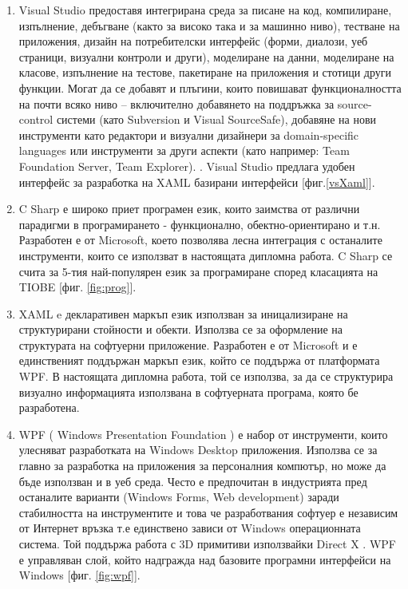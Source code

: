 \begin{enumerate}
    \item Visual Studio предоставя интегрирана среда за писане на код, компилиране, изпълнение, дебъгване (както за високо така и за машинно ниво), тестване на приложения, дизайн на потребителски интерфейс (форми, диалози, уеб страници, визуални контроли и други), моделиране на данни, моделиране на класове, изпълнение на тестове, пакетиране на приложения и стотици други функции. Могат да се добавят и плъгини, които повишават функционалността на почти всяко ниво – включително добавянето на поддръжка за source-control системи (като Subversion и Visual SourceSafe), добавяне на нови инструменти като редактори и визуални дизайнери за domain-specific languages или инструменти за други аспекти (като например: Team Foundation Server, Team Explorer). \cite{vs}. Visual Studio предлага удобен интерфейс за разработка на XAML базирани интерфейси [фиг.\ref{vsXaml}].
    
    \item C Sharp е широко приет програмен език, които заимства от различни парадигми в програмирането - функционално, обектно-ориентирано и т.н. Разработен е от Microsoft, което позволява лесна интеграция с останалите инструменти, които се използват в настоящата дипломна работа. C Sharp се счита за 5-тия най-популярен език за програмиране според класацията на TIOBE [фиг. \ref{fig:prog}].
    
    \item XAML e декларативен маркъп език използван за иницализиране на структурирани стойности и обекти. Използва се за оформление на структурата на софтуерни приложение. Разработен е от Microsoft и е единственият поддържан маркъп език, който се поддържа от платформата WPF. В настоящата дипломна работа, той се използва, за да се структурира визуално информацията използвана в софтуерната програма, която бе разработена.
    
    \item WPF ( Windows Presentation Foundation ) \cite{wpf} е набор от инструменти, които улесняват разработката на Windows Desktop приложения. Използва се за главно за разработка на приложения за персоналния компютър, но може да бъде използван и в уеб среда. Често е предпочитан в индустрията пред останалите варианти (Windows Forms, Web development) заради стабилността на инструментите и това че разработвания софтуер е независим от Интернет връзка т.е единствено зависи от Windows операционната система. Той поддържа работа с 3D примитиви използвайки Direct X \cite{wpfUsage}. WPF е управляван слой, който надгражда над базовите програмни интерфейси на Windows [фиг. \ref{fig:wpf}].
    

\end{enumerate}
